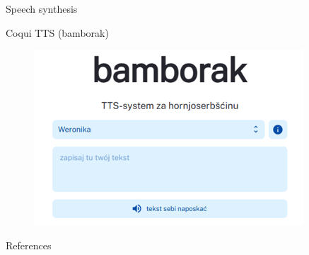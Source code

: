 \documentclass[final]{beamer}
\newlength{\sepwidth}
\newlength{\colwidth}
\newcommand{\separatorcolumn}{\begin{column}{\sepwidth}\end{column}}
\begin{document}
\begin{frame}[t]
\begin{columns}[t]
\begin{column}{\colwidth}
\begin{block}{Speech synthesis}

    Coqui TTS (bamborak\cite{bamborak})

    \begin{figure}
        \centering
        \includegraphics[width=0.75\colwidth]{bamborak_small.png}
        \label{fig:bamborak}
    \end{figure}
    

  \end{block}
  
  \begin{block}{References}

    \footnotesize{}

  \end{block}

\end{column}

\separatorcolumn
\end{columns}
\end{frame}
\end{document}
